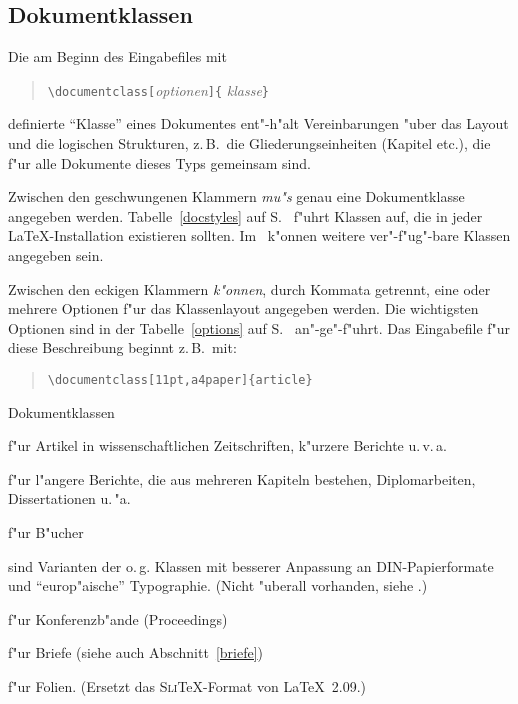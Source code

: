  
\subsection{Dokumentklassen}\label{docsty}
 
Die am Beginn des Eingabefiles  mit
\begin{verse}
\verb|\documentclass[|\textit{optionen}\verb|]{|%
  \textit{klasse}\verb|}|
\end{verse}
definierte "`Klasse"' eines Dokumentes ent"-h"alt 
Vereinbarungen "uber 
das Layout und die logischen Strukturen, z.\,B.\ die 
Gliederungseinheiten (Kapitel etc.\@), 
die f"ur alle Dokumente dieses Typs gemeinsam sind.

Zwischen den geschwungenen Klammern \emph{mu"s} genau eine Dokumentklasse
angegeben werden.  Tabelle~\ref{docstyles} auf S.~\pageref{docstyles}
f"uhrt Klassen auf,
die in jeder \LaTeX-Installation existieren sollten.  
Im \local\ k"onnen weitere ver"-f"ug"-bare 
Klassen angegeben sein.  
 
Zwischen den eckigen Klammern \emph{k"onnen}, durch Kommata getrennt, 
eine oder mehrere Optionen f"ur das Klassenlayout
angegeben werden. Die wichtigsten Optionen sind in der 
Tabelle~\ref{options} auf S.~\pageref{options} an"-ge"-f"uhrt.
Das Eingabefile f"ur diese Beschreibung beginnt z.\,B.\ mit:
\begin{verse}
\verb|\documentclass[11pt,a4paper]{article}|
\end{verse}

\begin{table}[hbpt]
\caption{Dokumentklassen} \label{docstyles}
\oben{11cm}
\begin{ttdescription}%
\item [article] f"ur Artikel in wissenschaftlichen Zeitschriften,
  k"ur\-ze\-re Berichte u.\,v.\,a.
 
\item [report] f"ur l"angere Berichte, die aus mehreren Kapiteln
  bestehen, Diplomarbeiten, Dissertationen u.\,"a.
 
\item [book] f"ur B"ucher

\item[scrartcl, scrreprt, scrbook] sind Varianten der o.\,g. Klassen
mit besserer Anpassung an DIN-Papierformate und "`euro\-p"aische"'
Typographie. (Nicht "uberall vorhanden, siehe \local.)

\item [proc] f"ur Konferenzb"ande (Proceedings)

\item [letter] f"ur Briefe (siehe auch Abschnitt~\ref{briefe})

\item [slides] f"ur Folien. (Ersetzt das \textsc{Sli}\TeX-Format
  von \LaTeX~2.09.)
  
\end{ttdescription}
\unten
\end{table}

